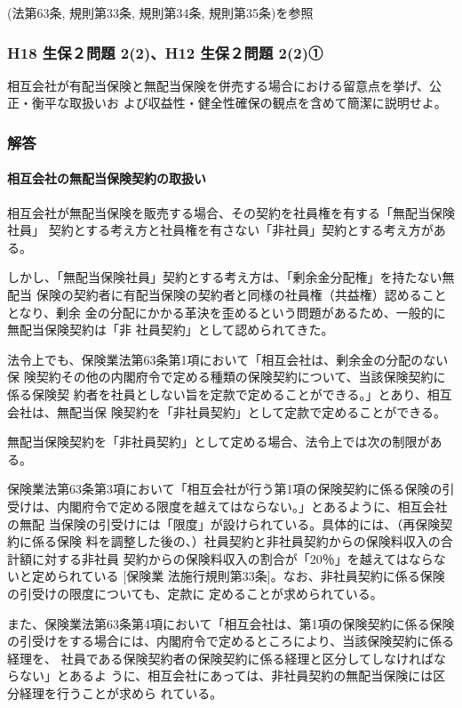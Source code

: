 \documentclass[report,gutter=10mm,fore-edge=10mm,uplatex,dvipdfmx]{jlreq}
\begin{document}
(法第63条, 規則第33条, 規則第34条, 規則第35条)を参照

\subsubsection{H18 生保２問題 2(2)、H12 生保２問題 2(2)①}
相互会社が有配当保険と無配当保険を併売する場合における留意点を挙げ、公正・衡平な取扱いお
よび収益性・健全性確保の観点を含めて簡潔に説明せよ。
\subsubsection{解答}
\paragraph{相互会社の無配当保険契約の取扱い}

相互会社が無配当保険を販売する場合、その契約を社員権を有する「無配当保険社員」
契約とする考え方と社員権を有さない「非社員」契約とする考え方がある。

しかし、「無配当保険社員」契約とする考え方は、「剰余金分配権」を持たない無配当
保険の契約者に有配当保険の契約者と同様の社員権（共益権）認めることとなり、剰余
金の分配にかかる革決を歪めるという問題があるため、一般的に無配当保険契約は「非
社員契約」として認められてきた。

法令上でも、保険業法第63条第1項において「相互会社は、剰余金の分配のない保
険契約その他の内閣府令で定める種類の保険契約について、当該保険契約に係る保険契
約者を社員としない旨を定款で定めることができる。」とあり、相互会社は、無配当保
険契約を「非社員契約」として定款で定めることができる。

無配当保険契約を「非社員契約」として定める場合、法令上では次の制限がある。

保険業法第63条第3項において「相互会社が行う第1項の保険契約に係る保険の引
受けは、内閣府令で定める限度を越えてはならない。」とあるように、相互会社の無配
当保険の引受けには「限度」が設けられている。具体的には、（再保険契約に係る保険
料を調整した後の、）社員契約と非社員契約からの保険料収入の合計額に対する非社員
契約からの保険料収入の割合が「20％」を越えてはならないと定められている [保険業
法施行規則第33条]。なお、非社員契約に係る保険の引受けの限度についても、定款に
定めることが求められている。

また、保険業法第63条第4項において「相互会社は、第1項の保険契約に係る保険
の引受けをする場合には、内閣府令で定めるところにより、当該保険契約に係る経理を、
社員である保険契約者の保険契約に係る経理と区分してしなければならない」とあるよ
うに、相互会社にあっては、非社員契約の無配当保険には区分経理を行うことが求めら
れている。
\end{document}
